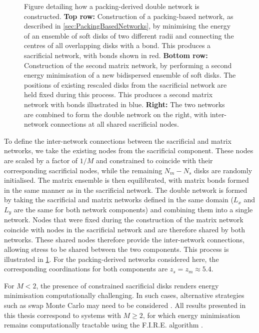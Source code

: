 \begin{figure}[bt]
\centering
\resizebox{0.99\textwidth}{!}{}
\caption[Figure detailing how a packing-derived double network is constructed]{Figure detailing how a packing-derived double network is constructed. 
{\bf Top row:} Construction of a packing-based network, as described in \cref{sec:PackingBasedNetworks}, by minimising the energy of an ensemble of soft disks of two different radii and connecting the centres of all overlapping disks with a bond. This produces a sacrificial network, with bonds shown in red. \newline
{\bf Bottom row:} Construction of the second matrix network, by performing a second energy minimisation of a new bidispersed ensemble of soft disks. The positions of existing rescaled disks from the sacrificial network are held fixed during this process. This produces a second matrix network with bonds illustrated in blue. \newline
{\bf Right:} The two networks are combined to form the double network on the right, with inter-network connections at all shared sacrificial nodes.}
\label{fig:DoubleJammedNetwork}
\end{figure}

To define the inter-network connections between the sacrificial and matrix networks, we take the existing nodes from the sacrificial component. These nodes are scaled by a factor of $1/M$ and constrained to coincide with their corresponding sacrificial nodes, while the remaining $N_m - N_s$ disks are randomly initialised. The matrix ensemble is then equilibrated, with matrix bonds formed in the same manner as in the sacrificial network. The double network is formed by taking the sacrificial and matrix networks defined in the same domain ($L_x$ and $L_y$ are the same for both network components) and combining them into a single network. Nodes that were fixed during the construction of the matrix network coincide with nodes in the sacrificial network and are therefore shared by both networks. These shared nodes therefore provide the inter-network connections, allowing stress to be shared between the two components. This process is illustrated in \cref{fig:DoubleJammedNetwork}. For the packing-derived networks considered here, the corresponding coordinations for both components are $z_s = z_m \approx 5.4$.

For $M < 2$, the presence of constrained sacrificial disks renders energy minimisation computationally challenging. In such cases, alternative strategies such as swap Monte Carlo may need to be considered \cite{NiklasSwapMonte2023}. All results presented in this thesis correspond to systems with $M \geq 2$, for which energy minimisation remains computationally tractable using the F.I.R.E. algorithm \cite{guenole_assessment_2020}.
    
